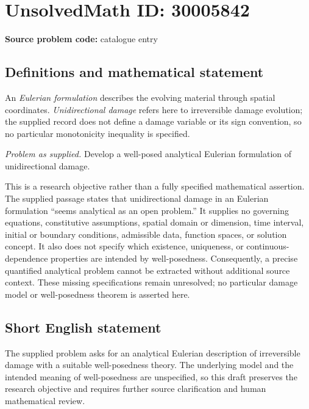 \documentclass[11pt]{article}
\begin{document}
\section*{UnsolvedMath ID: 30005842}
\textbf{Source problem code:} catalogue entry
\subsection{Definitions and mathematical statement}
An \emph{Eulerian formulation} describes the evolving material through spatial coordinates. \emph{Unidirectional damage} refers here to irreversible damage evolution; the supplied record does not define a damage variable or its sign convention, so no particular monotonicity inequality is specified.

\emph{Problem as supplied.} Develop a well-posed analytical Eulerian formulation of unidirectional damage.

This is a research objective rather than a fully specified mathematical assertion. The supplied passage states that unidirectional damage in an Eulerian formulation ``seems analytical as an open problem.'' It supplies no governing equations, constitutive assumptions, spatial domain or dimension, time interval, initial or boundary conditions, admissible data, function spaces, or solution concept. It also does not specify which existence, uniqueness, or continuous-dependence properties are intended by well-posedness. Consequently, a precise quantified analytical problem cannot be extracted without additional source context. These missing specifications remain unresolved; no particular damage model or well-posedness theorem is asserted here.
\subsection{Short English statement}
The supplied problem asks for an analytical Eulerian description of irreversible damage with a suitable well-posedness theory. The underlying model and the intended meaning of well-posedness are unspecified, so this draft preserves the research objective and requires further source clarification and human mathematical review.
\end{document}
